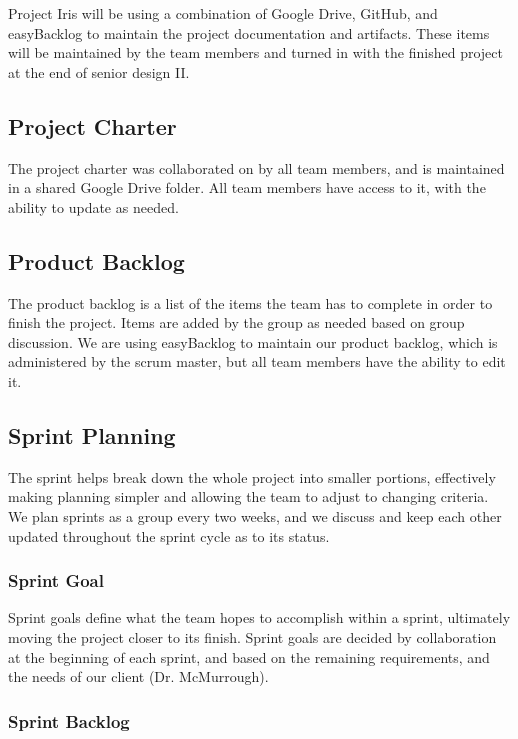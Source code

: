 
Project Iris will be using a combination of Google Drive, GitHub, and easyBacklog to maintain the project documentation and artifacts. These items will be maintained by the team members and turned in with the finished project at the end of senior design II.

\subsection{Project Charter}

The project charter was collaborated on by all team members, and is maintained in a shared Google Drive folder. All team members have access to it, with the ability to update as needed.

\subsection{Product Backlog}

The product backlog is a list of the items the team has to complete in order to finish the project. Items are added by the group as needed based on group discussion. We are using easyBacklog to maintain our product backlog, which is administered by the scrum master, but all team members have the ability to edit it.

\subsection{Sprint Planning}

The sprint helps break down the whole project into smaller portions, effectively making planning simpler and allowing the team to adjust to changing criteria. We plan sprints as a group every two weeks, and we discuss and keep each other updated throughout the sprint cycle as to its status.

\subsubsection{Sprint Goal}

Sprint goals define what the team hopes to accomplish within a sprint, ultimately moving the project closer to its finish. Sprint goals are decided by collaboration at the beginning of each sprint, and based on the remaining requirements, and the needs of our client (Dr. McMurrough).

\subsubsection{Sprint Backlog}

